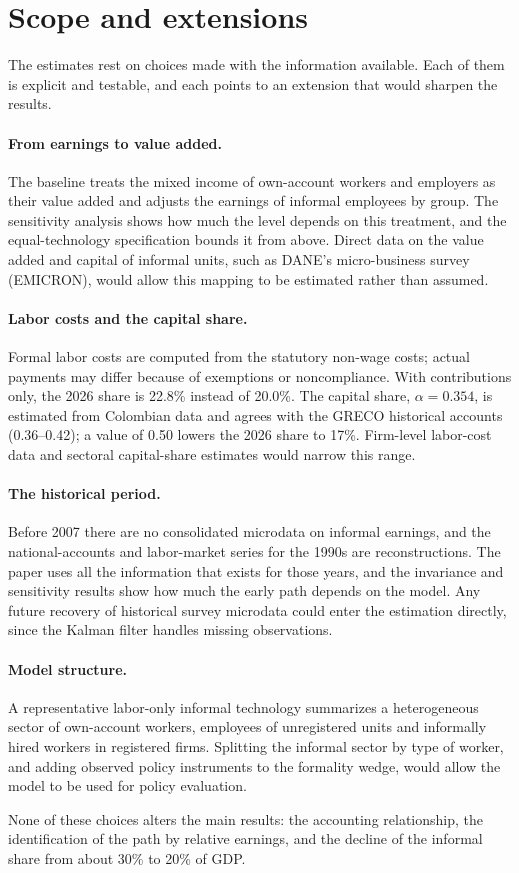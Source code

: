 \section{Scope and extensions}
\label{sec:limitations}

The estimates rest on choices made with the information available. Each of them is explicit and testable, and each points to an extension that would sharpen the results.

\paragraph{From earnings to value added.} The baseline treats the mixed income of own-account workers and employers as their value added and adjusts the earnings of informal employees by group. The sensitivity analysis shows how much the level depends on this treatment, and the equal-technology specification bounds it from above. Direct data on the value added and capital of informal units, such as DANE's micro-business survey (EMICRON), would allow this mapping to be estimated rather than assumed.

\paragraph{Labor costs and the capital share.} Formal labor costs are computed from the statutory non-wage costs; actual payments may differ because of exemptions or noncompliance. With contributions only, the 2026 share is 22.8\% instead of 20.0\%. The capital share, $\alpha=0.354$, is estimated from Colombian data and agrees with the GRECO historical accounts (0.36--0.42); a value of 0.50 lowers the 2026 share to 17\%. Firm-level labor-cost data and sectoral capital-share estimates would narrow this range.

\paragraph{The historical period.} Before 2007 there are no consolidated microdata on informal earnings, and the national-accounts and labor-market series for the 1990s are reconstructions. The paper uses all the information that exists for those years, and the invariance and sensitivity results show how much the early path depends on the model. Any future recovery of historical survey microdata could enter the estimation directly, since the Kalman filter handles missing observations.

\paragraph{Model structure.} A representative labor-only informal technology summarizes a heterogeneous sector of own-account workers, employees of unregistered units and informally hired workers in registered firms. Splitting the informal sector by type of worker, and adding observed policy instruments to the formality wedge, would allow the model to be used for policy evaluation.

None of these choices alters the main results: the accounting relationship, the identification of the path by relative earnings, and the decline of the informal share from about 30\% to 20\% of GDP.
